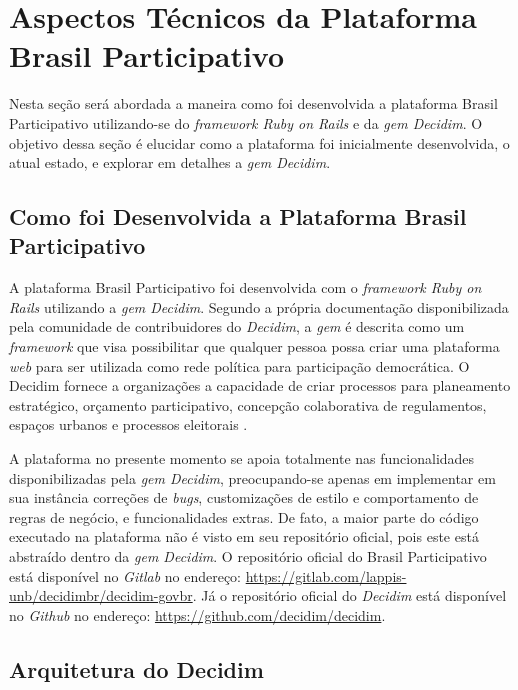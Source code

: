 \section{Aspectos Técnicos da Plataforma Brasil Participativo}

Nesta seção será abordada a maneira como foi desenvolvida a plataforma Brasil Participativo utilizando-se do \textit{framework Ruby on Rails} e da \textit{gem Decidim}. O objetivo dessa seção é elucidar como a plataforma foi inicialmente desenvolvida, o atual estado, e explorar em detalhes a \textit{gem Decidim}.

\subsection{Como foi Desenvolvida a Plataforma Brasil Participativo}

A plataforma Brasil Participativo foi desenvolvida com o \textit{framework Ruby on Rails} utilizando a \textit{gem Decidim}. Segundo a própria documentação disponibilizada pela comunidade de contribuidores do \textit{Decidim}, a \textit{gem} é descrita como um \textit{framework} que visa possibilitar que qualquer pessoa possa criar uma plataforma \textit{web} para ser utilizada como rede política para participação democrática. O Decidim fornece a organizações a capacidade de criar processos para planeamento estratégico, orçamento participativo, concepção colaborativa de regulamentos, espaços urbanos e processos eleitorais \cite{decidim-about}.

A plataforma no presente momento se apoia totalmente nas funcionalidades disponibilizadas pela \textit{gem Decidim}, preocupando-se apenas em implementar em sua instância correções de \textit{bugs}, customizações de estilo e comportamento de regras de negócio, e funcionalidades extras. De fato, a maior parte do código executado na plataforma não é visto em seu repositório oficial, pois este está abstraído dentro da \textit{gem Decidim}. O repositório oficial do Brasil Participativo está disponível no \textit{Gitlab} no endereço: \href{https://gitlab.com/lappis-unb/decidimbr/decidim-govbr}{https://gitlab.com/lappis-unb/decidimbr/decidim-govbr}. Já o repositório oficial do \textit{Decidim} está disponível no \textit{Github} no endereço: \href{https://github.com/decidim/decidim}{https://github.com/decidim/decidim}.


\subsection{Arquitetura do Decidim}

